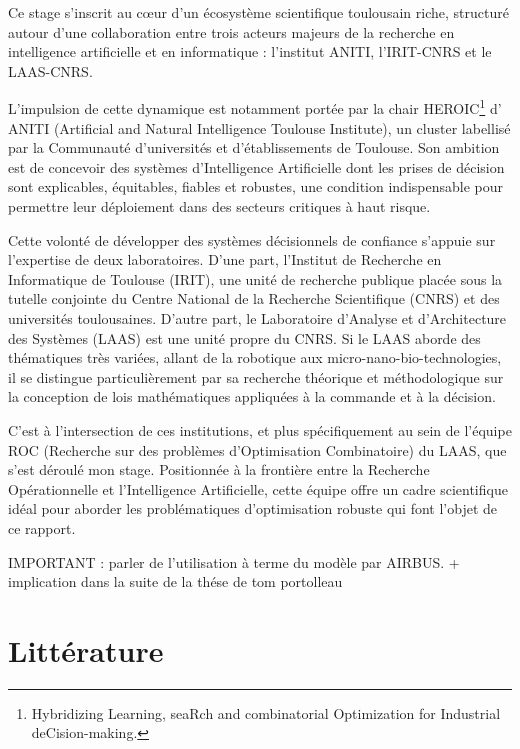 \documentclass[12pt, a4paper, twoside]{report}
\numberwithin{equation}{section}
\begin{document}
	Ce stage s'inscrit au cœur d'un écosystème scientifique toulousain riche, structuré autour d'une collaboration entre trois acteurs majeurs de la recherche en intelligence artificielle et en informatique : l'institut ANITI, l'IRIT-CNRS et le LAAS-CNRS.
	
	L'impulsion de cette dynamique est notamment portée par la chair HEROIC\footnote{Hybridizing Learning, seaRch and combinatorial Optimization for Industrial deCision-making.} d' ANITI (Artificial and Natural Intelligence Toulouse Institute), un cluster labellisé par la Communauté d'universités et d'établissements de Toulouse. Son ambition est de concevoir des systèmes d'Intelligence Artificielle dont les prises de décision sont explicables, équitables, fiables et robustes, une condition indispensable pour permettre leur déploiement dans des secteurs critiques à haut risque.
	
	Cette volonté de développer des systèmes décisionnels de confiance s'appuie sur l'expertise de deux laboratoires. D'une part, l'Institut de Recherche en Informatique de Toulouse (IRIT), une unité de recherche publique placée sous la tutelle conjointe du Centre National de la Recherche Scientifique (CNRS) et des universités toulousaines. D'autre part, le Laboratoire d'Analyse et d'Architecture des Systèmes (LAAS) est une unité propre du CNRS. Si le LAAS aborde des thématiques très variées, allant de la robotique aux micro-nano-bio-technologies, il se distingue particulièrement par sa recherche théorique et méthodologique sur la conception de lois mathématiques appliquées à la commande et à la décision.
	
	C'est à l'intersection de ces institutions, et plus spécifiquement au sein de l'équipe ROC (Recherche sur des problèmes d'Optimisation Combinatoire) du LAAS, que s'est déroulé mon stage. Positionnée à la frontière entre la Recherche Opérationnelle et l'Intelligence Artificielle, cette équipe offre un cadre scientifique idéal pour aborder les problématiques d'optimisation robuste qui font l'objet de ce rapport.
	
	IMPORTANT : parler de l'utilisation à terme du modèle par AIRBUS. + implication dans la suite de la thése de tom portolleau
	
	
	\clearpage
	\section{Littérature}
	
\end{document}

